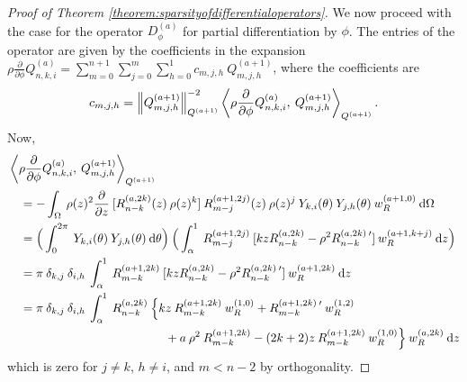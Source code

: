 \documentclass[11pt, oneside]{article}   	%
\newcommand{\genjac}{R}
\newcommand{\genjacnmk}{\genjac_{n-k}}
\newcommand{\genjacmmj}{\genjac_{m-j}}
\newcommand{\genjacw}{w_\genjac}
\newcommand{\scop}{Q}
\newcommand{\scopnki}{\scop_{n,k,i}}
\newcommand{\scopmjh}{\scop_{m,j,h}}
\newcommand{\scopnkia}{\scopnki^{(a)}}
\newcommand{\ch}{Y}
\newcommand{\chki}{\ch_{k,i}}
\newcommand{\chjh}{\ch_{j,h}}
\newcommand{\ppphi}{\frac{\partial}{\partial \phi}}
\newcommand{\ppz}{\frac{\partial}{\partial z}}
\newcommand{\rhoppphi}{\rho \ppphi}
\begin{document}
\begin{proof}[Proof of Theorem \ref{theorem:sparsityofdifferentialoperators}]
We now proceed with the case for the operator $D_\phi^{(a)}$ for partial differentiation by $\phi$. The entries of the operator are given by the coefficients in the expansion $\rhoppphi \scopnkia = \sum_{m=0}^{n+1} \sum_{j=0}^m \sum_{h=0}^1 c_{m,j,h} \: \scopmjh^{(a+1)}$, where the coefficients are
\begin{align*}
	c_{m,j,h} = \norm{\scopmjh^{(a+1)}}^{-2}_{\scop^{(a+1)}} \ip<\rhoppphi \scopnkia, \: \scopmjh^{(a+1)}>_{\scop^{(a+1)}}.
\end{align*}
Now,
\begin{align*}
	&\ip<\rhoppphi \scopnkia, \: \scopmjh^{(a+1)}>_{\scop^{(a+1)}} \\
	&\quad = - \int_\Omega \: \rho(z)^2 \ppz \:  [\genjacnmk^{(a,2k)}(z) \: \rho(z)^k] \: \genjacmmj^{(a+1,2j)}(z) \: \rho(z)^j \: \chki(\theta) \: \chjh(\theta) \: \genjacw^{(a+1, 0)} \: \D \Omega \\
	&\quad = \Big( \int_0^{2\pi} \: \chki(\theta) \: \chjh(\theta) \: \D \theta \Big) \: \Big( \int_\alpha^1 \: \genjacmmj^{(a+1,2j)} \: [k z \genjacnmk^{(a, 2k)} - \rho^2 \genjacnmk^{(a, 2k) \: \prime}] \: \genjacw^{(a+1, k + j)} \: \D z \Big) \\
	&\quad = \pi \: \delta_{k,j} \: \delta_{i,h} \: \int_\alpha^1 \: \genjac_{m-k}^{(a+1,2k)} \: [k z \genjacnmk^{(a, 2k)} - \rho^2 \genjacnmk^{(a, 2k) \: \prime}] \: \genjacw^{(a+1, 2k)} \: \D z \\
	&\quad = \pi \: \delta_{k,j} \: \delta_{i,h} \: \int_\alpha^1 \: \genjacnmk^{(a, 2k)} \: \Big\{  k z \: \genjac_{m-k}^{(a+1,2k)} \: \genjacw^{(1, 0)} + \genjac_{m-k}^{(a+1,2k) \: \prime} \: \genjacw^{(1, 2)}\\
	&\quad \quad \quad \quad \quad \quad \quad \quad \quad \quad \quad \quad \quad + a \: \rho^2 \: \genjac_{m-k}^{(a+1,2k)} - (2k+2) z \: \genjac_{m-k}^{(a+1,2k)} \: \genjacw^{(1, 0)} \Big\} \: \genjacw^{(a, 2k)} \: \D z
\end{align*}
which is zero for $j \ne k$, $h \ne i$, and $m < n - 2$ by orthogonality.


\end{proof}
\end{document}
